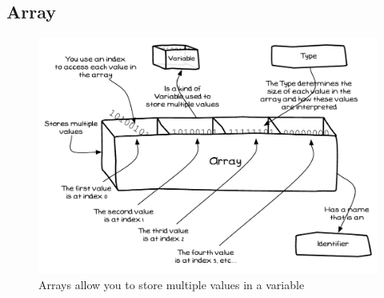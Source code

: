 \clearpage
\subsection{Array} %
\label{sub:array}

\begin{figure}[h]
   \centering
   \includegraphics[width=\textwidth]{./topics/arrays/diagrams/Array} 
   \caption{Arrays allow you to store multiple values in a variable}
   \label{fig:type-decl-array}
\end{figure}


